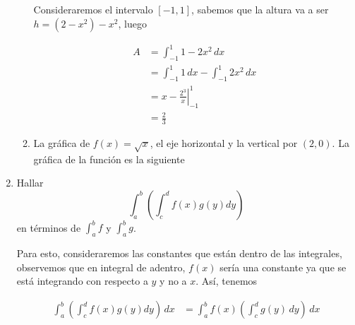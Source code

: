 \documentclass{report}
\begin{document}
\begin{enumerate}
\begin{enumerate}
                Consideraremos el intervalo $[-1, 1]$, sabemos que la altura va a ser $h = (2-x^2)-x^2$, luego

                \begin{align*}
                    A &= \int_{-1}^{1}1-2x^2\,dx\\
                    &= \int_{-1}^{1}1\,dx - \int_{-1}^{1}2x^2\,dx\\
                    &= \left. x - \frac{2^3}{x} \right|_{-1}^{1}\\
                    &= \frac{2}{3}
                \end{align*}
                \setcounter{enumii}{5}
                \item La gráfica de $f(x) = \sqrt{x}$, el eje horizontal y la vertical por $(2, 0)$.
                La gráfica de la función es la siguiente

                \begin{center}
                \end{center}

            \end{enumerate}
            \item Hallar
            $$\int_{a}^{b}\left(\int_{c}^{d}f(x)g(y)dy\right)$$
            en términos de $\int_{a}^{b}f$ y $\int_{a}^{b}g$.

            Para esto, consideraremos las constantes que están dentro de las integrales, observemos que en integral de adentro, $f(x)$ sería una constante ya que se está integrando con respecto a $y$ y no a $x$. Así, tenemos

            \begin{align*}
                \int_{a}^{b}\left(\int_{c}^{d}f(x)g(y)dy\right)\, dx &= \int_{a}^{b}f(x)\left(\int_{c}^{d}g(y)\, dy\right)\, dx
            \end{align*}


\end{enumerate}
\end{document}
